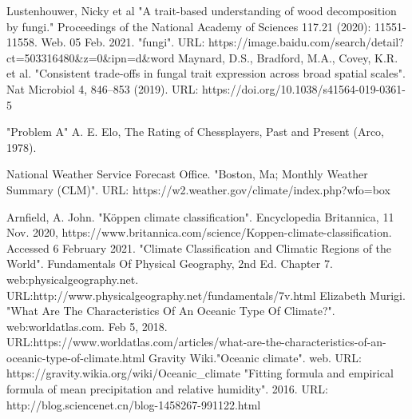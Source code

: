 \documentclass[a4paper,12pt]{article}
\begin{document}
\begin{thebibliography}{20}
\setlength{\itemsep}{-0.5mm}
		Lustenhouwer, Nicky et al "A trait-based understanding of wood decomposition by fungi." Proceedings of the National Academy of Sciences 117.21 (2020): 11551-11558. Web. 05 Feb. 2021.
        "fungi". URL: https://image.baidu.com/search/detail?ct=503316480\&z=0\&ipn=d\&word
        Maynard, D.S., Bradford, M.A., Covey, K.R. et al. "Consistent trade-offs in fungal trait expression across broad spatial scales". Nat Microbiol 4, 846–853 (2019). URL: https://doi.org/10.1038/s41564-019-0361-5
		
		"Problem A"
		 A. E. Elo, The Rating of Chessplayers, Past and Present (Arco, 1978).
		 
        National Weather Service Forecast Office. "Boston, Ma; Monthly Weather Summary (CLM)". URL: https://w2.weather.gov/climate/index.php?wfo=box


Arnfield, A. John. "Köppen climate classification". Encyclopedia Britannica, 11 Nov. 2020, https://www.britannica.com/science/Koppen-climate-classification. Accessed 6 February 2021.
		"Climate Classification and Climatic Regions of the World". Fundamentals Of Physical Geography, 2nd Ed. Chapter 7. web:physicalgeography.net. URL:http://www.physicalgeography.net/fundamentals/7v.html
		Elizabeth Murigi. "What Are The Characteristics Of An Oceanic Type Of Climate?". web:worldatlas.com. Feb 5, 2018. URL:https://www.worldatlas.com/articles/what-are-the-characteristics-of-an-oceanic-type-of-climate.html
		Gravity Wiki."Oceanic climate". web. URL: https://gravity.wikia.org/wiki/Oceanic\_climate
        "Fitting formula and empirical formula of mean precipitation and relative humidity". 2016. URL: http://blog.sciencenet.cn/blog-1458267-991122.html

		\end{thebibliography}
		
		
		
\end{document}

